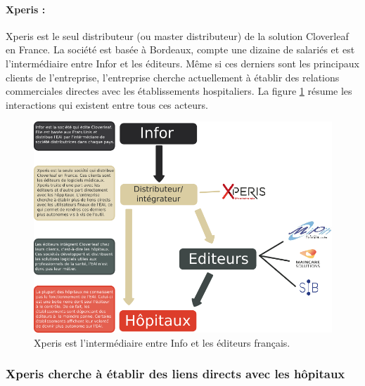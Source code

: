 			\paragraph{Xperis :}
			Xperis est le seul distributeur (ou master distributeur) de la solution
			Cloverleaf en France. La société est basée à Bordeaux, compte une dizaine de
			salariés et est l'intermédiaire entre Infor et les éditeurs.
			Même si ces derniers sont les principaux clients de l'entreprise,
			l'entreprise cherche actuellement à établir des relations commerciales
			directes avec les établissements hospitaliers.\newline
			La figure \ref{xperis_secteur} résume les interactions qui existent entre
			tous ces acteurs.
			\begin{figure}[H]%
				\centering
				\includegraphics[width=17cm]{../img/xperis_secteur.png}
				\caption{\label{xperis_secteur} Xperis est l'intermédiaire entre Info et
				les éditeurs français.}
			\end{figure}
			
		\subsubsection{Xperis cherche à établir des liens directs avec les hôpitaux}
